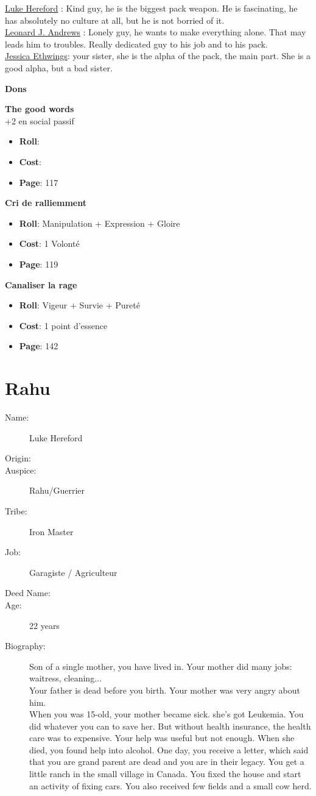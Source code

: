 \documentclass[oneside,12pt]{book}
\newcommand\don[5]{
\textbf{#1} \\
#2
\begin{itemize}
\item{ \textbf{Roll}: #3}
\item{ \textbf{Cost}: #4}
\item{ \textbf{Page}: #5}
\end{itemize}
\vspace{0.5cm}
}
\begin{document}
\begin{flushleft}
\begin{description}
{\underline{Luke Hereford} : Kind guy, he is the biggest pack weapon. He is fascinating, he has absolutely no culture at all, but he is not borried of it.\\
\underline{Leonard J. Andrews} : Lonely guy, he wants to make everything alone. That may leads him to troubles. Really dedicated guy to his job and to his pack.\\
\underline{Jessica  Ethwings}: your sister, she is the alpha of the pack, the main part. She is a good alpha, but a bad sister. \\
}
\end{description}
\clearpage
\textbf{\large Dons} 
\vspace{0.5cm}

\don{The good words}{+2 en social passif}{}{}{117}
\don{Cri de ralliemment}{}{Manipulation + Expression + Gloire}{1 Volonté}{119}
\don{Canaliser la rage}{}{Vigeur + Survie + Pureté}{1 point d'essence}{142}

\clearpage
\section{Rahu}
\begin{description}
\item[Name:]{Luke Hereford}
\item[Origin:]{}
\item[Auspice:]{Rahu/Guerrier}
\item[Tribe:]{Iron Master}
\item[Job:]{Garagiste / Agriculteur}
\item[Deed Name:]{}
\item[Age:]{22 years}
\item[Biography:]{
Son of a single mother, you have lived in. Your mother did many jobs: waitress, cleaning... \\
Your father is dead before you birth. Your mother was very angry about him.\\
When you was 15-old, your mother became sick. she's got Leukemia. You did whatever you can to save her. 
But without health insurance, the health care was to expensive. Your help was useful but not enough.
When she died, you found help into alcohol. One day, you receive a letter, which said that you are grand parent are dead and you are in their legacy. 
You get a little ranch in the small village in Canada. You fixed the house and start an activity of fixing cars. You also received few fields and a small cow herd. 



}
\end{description}
\end{flushleft}
\end{document}
